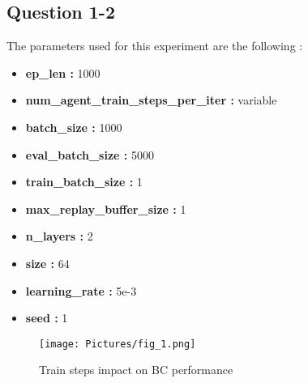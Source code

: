\documentclass{article}
\begin{document}
\subsection{Question 1-2}
The parameters used for this experiment are the following :
\begin{itemize}
  \item \textbf{ep\_len : } 1000
  \item \textbf{num\_agent\_train\_steps\_per\_iter : } variable
  \item \textbf{batch\_size : } 1000
  \item \textbf{eval\_batch\_size : } 5000
  \item \textbf{train\_batch\_size : } 1
  \item \textbf{max\_replay\_buffer\_size : } 1
  \item \textbf{n\_layers : } 2
  \item \textbf{size : } 64
  \item \textbf{learning\_rate : } 5e-3
  \item \textbf{seed : } 1
  
  
  
\end{itemize}
\begin{figure}[h]
    \centering
    \texttt{[image: Pictures/fig\_1.png]}
    \caption{Train steps impact on BC performance }
\end{figure}


%
%
\end{document}
